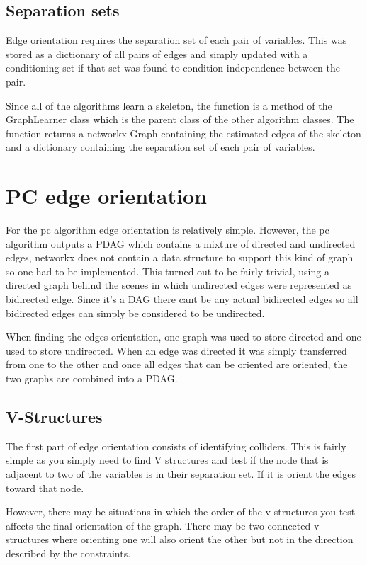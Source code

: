 \documentclass{UoYCSproject}
\begin{document}
\subsection{Separation sets}
Edge orientation requires the separation set of each pair of variables. This was stored as a dictionary of all pairs of edges and simply updated with a conditioning set if that set was found to condition independence between the pair.

Since all of the algorithms learn a skeleton, the function is a method of the GraphLearner class which is the parent class of the other algorithm classes. The function returns a networkx Graph containing the estimated edges of the skeleton and a dictionary containing the separation set of each pair of variables.

\section{PC edge orientation}
For the pc algorithm edge orientation is relatively simple. However, the pc algorithm outputs a PDAG which contains a mixture of directed and undirected edges, networkx does not contain a data structure to support this kind of graph so one had to be implemented. This turned out to be fairly trivial, using a directed graph behind the scenes in which undirected edges were represented as bidirected edge. Since it's a DAG there cant be any actual bidirected edges so all bidirected edges can simply be considered to be undirected.

When finding the edges orientation, one graph was used to store directed and one used to store undirected. When an edge was directed it was simply transferred from one to the other and once all edges that can be oriented are oriented, the two graphs are combined into a PDAG.

\subsection{V-Structures}
The first part of edge orientation consists of identifying colliders. This is fairly simple as you simply need to find V structures and test if the node that is adjacent to two of the variables is in their separation set. If it is orient the edges toward that node.

However, there may be situations in which the order of the v-structures you test affects the final orientation of the graph. There may be two connected v-structures where orienting one will also orient the other but not in the direction described by the constraints.
\end{document}
